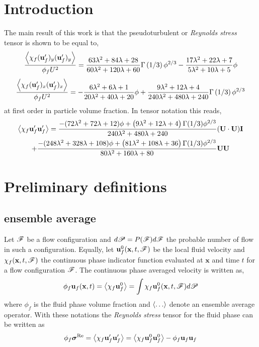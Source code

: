 \section{Introduction}

The main result of this work is that the pseudoturbulent or \textit{Reynolds stress } tensor is shown to be equal to,
\begin{equation}
    \frac{\left<\chi_f (\textbf{u}_f')_y (\textbf{u}_f')_y\right>}{\phi_f  U^2}
    = 
    \frac{63\lambda^2+84\lambda+28}{60\lambda^2+120\lambda+60} \Gamma\left(1/3\right)  \phi^{2/3}
    - \frac{17\lambda^2+22\lambda+7}{5\lambda^2+10\lambda+5} \phi
\end{equation}
\begin{equation}
    \frac{\left<\chi_f (\textbf{u}_f')_x (\textbf{u}_f')_x\right>}{\phi_f  U^2}
    = 
    - \frac{6\lambda^2+6\lambda+1}{20\lambda^2+40\lambda+20} \phi
    +\frac{9\lambda^2+12\lambda+4}{240\lambda^2+480\lambda+240} \Gamma\left(1/3\right) \phi^{2/3}
\end{equation}
at first order in particle volume fraction. 
In tensor notation this reads, 
\begin{multline}
    \left<\chi_f \textbf{u}_f'\textbf{u}_f'\right>
    =
    \frac{- (72\lambda^2 + 72\lambda + 12)\phi + 
    \left(9\lambda^2 + 12\lambda + 4\right)\Gamma(1/3) \phi^{2/3}}{240\lambda^2 + 480\lambda + 240}
    (\textbf{U}\cdot \textbf{U}) \textbf{I}\\
    + 
    \frac{- (248\lambda^2 + 328\lambda + 108)\phi + 
    \left(81\lambda^2 + 108\lambda + 36\right)\Gamma(1/3) \phi^{2/3}}{80\lambda^2 + 160\lambda + 80}
    \textbf{UU}\\
\end{multline}
\section{Preliminary definitions}

\subsection{ensemble average}
Let $\mathscr{F}$ be a flow configuration and $d\mathscr{P} = P(\mathscr{F})d\mathscr{F}$ the probable number of flow in such a configuration. 
Equally, let $\textbf{u}_f^0(\textbf{x},t,\mathscr{F})$ be the local fluid velocity and $\chi_f(\textbf{x},t,\mathscr{F})$ the continuous phase indicator function evaluated at $\textbf{x}$ and time $t$ for a flow configuration $\mathscr{F}$. 
The continuous phase averaged velocity is written as, 
\begin{equation}
    \phi_f \textbf{u}_f(\textbf{x},t)
    = \left<\chi_f \textbf{u}_f^0\right> 
    = \int  \chi_f \textbf{u}_f^0(\textbf{x},t,\mathscr{F}) d\mathscr{P}
\end{equation}
where $\phi_f$ is the fluid phase volume fraction and $\left<\ldots\right>$ denote an ensemble average operator. 
With these notations the \textit{Reynolds stress} tensor for the fluid phase can be written as 
\begin{equation}
    \phi_f \bm\sigma^\text{Re}
    =\left<\chi_f \textbf{u}_f'\textbf{u}_f'\right>
    =\left<\chi_f \textbf{u}_f^0 \textbf{u}_f^0 \right>
    - \phi_f \textbf{u}_f \textbf{u}_f
\end{equation}
